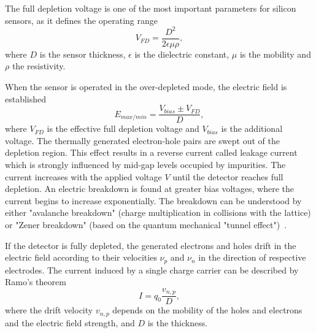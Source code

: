 The full depletion voltage is one of the most important parameters for silicon sensors, as it defines the operating range
\begin{equation}
    V_{FD} = \frac{D^{2}}{2\epsilon \mu \rho},
\end{equation}
where $D$ is the sensor thickness, $\epsilon$ is the dielectric constant, $\mu$ is the mobility and $\rho$ the resistivity.

When the sensor is operated in the over-depleted mode, the electric field is established
\begin{equation}
    E_{max/min} = \frac{V_{bias}\pm V_{FD}}{D},
\end{equation}
where $V_{FD}$ is the effective full depletion voltage and $V_{bias}$ is the additional voltage. The thermally generated electron-hole pairs are swept out of the depletion region. This effect results in a reverse current called leakage current which is strongly influenced by mid-gap levels occupied by impurities. The current increases with the applied voltage ${V}$ until the detector reaches full depletion. An electric breakdown is found at greater bias voltages, where the current begins to increase exponentially. The breakdown can be understood by either "avalanche breakdown" (charge multiplication in collisions with the lattice) or "Zener breakdown" (based on the quantum mechanical "tunnel effect")~\cite{Hartmann:2017gzy}.

If the detector is fully depleted, the generated electrons and holes drift in the electric field according to their velocities $\nu_{p}$ and $\nu_{n}$ in the direction of respective electrodes. The current induced by a single charge carrier can be described by Ramo's theorem
\begin{equation}
    I = q_{0}\frac{v_{n,p}}{D},
\end{equation}
where the drift velocity $v_{n,p}$ depends on the mobility of the holes and electrons and the electric field strength, and $D$ is the thickness.

